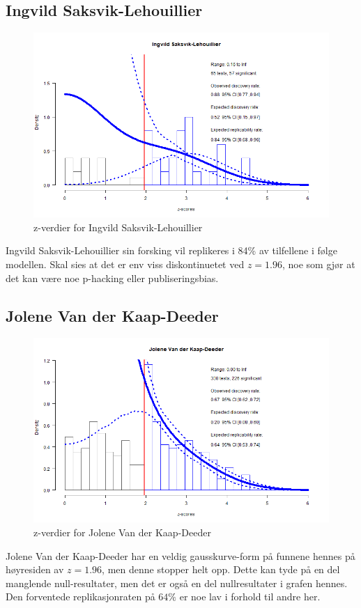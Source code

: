 \documentclass[doc,norsk]{apa7}
\begin{document}
\subsection{Ingvild Saksvik-Lehouillier}
\begin{figure}[h!]
    \centering
    \includegraphics[width=\textwidth]{images/Ingvild Saksvik-Lehouillier.png}
    \caption{z-verdier for Ingvild Saksvik-Lehouillier}
\end{figure}
Ingvild Saksvik-Lehouillier sin forsking vil replikeres i 84\% av tilfellene i følge modellen. Skal sies at det er env viss diskontinuetet ved $z=1.96$, noe som gjør at det kan være noe p-hacking eller publiseringsbias.

\subsection{Jolene Van der Kaap-Deeder}
\begin{figure}[h!]
    \centering
    \includegraphics[width=\textwidth]{images/Jolene Van der Kaap-Deeder.png}
    \caption{z-verdier for Jolene Van der Kaap-Deeder}
\end{figure}
Jolene Van der Kaap-Deeder har en veldig gausskurve-form på funnene hennes på høyresiden av $z=1.96$, men denne stopper helt opp. Dette kan tyde på en del manglende null-resultater, men det er også en del nullresultater i grafen hennes. Den forventede replikasjonraten på $64\%$ er noe lav i forhold til andre her.
\end{document}
